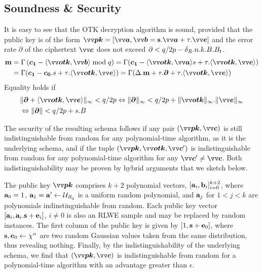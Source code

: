 \subsection{Soundness \& Security} It is easy to see that the OTK decryption algorithm is sound, provided that the public key is of the form $\pv{pk}=[\pv{a},\pv{b}=\ps.\pv{a}+\tau.\pv{e}]$ and the error rate $\partial$ of the ciphertext $\pv{c}$ does not exceed $\partial < q/2p - \delta_{\mathit{R}}.n.k.B.B_t$.
\begin{align*}
    \ppm&=\Gamma\left(\p{c_1} - \inprod{\pv{otk}}{\pv{b}} \bmod q\right)
    =\Gamma(\p{c_1} - \inprod{\pv{otk}}{\pv{a}}s+\tau.\inprod{\pv{otk}}{\pv{e}})\\
    &=\Gamma(\p{c_1} - \p{c_0}.s+\tau.\inprod{\pv{otk}}{\pv{e}})
    =\Gamma(\Delta.\ppm+\tau.\p{\partial} + \tau.\inprod{\pv{otk}}{\pv{e}})
\end{align*}
Equality holds if 
\begin{align*}
    &\|\p{\partial} + \inprod{\pv{otk}}{\pv{e}}\|_{\infty} < q/2p \Leftrightarrow
    \|\p{\partial}\|_{\infty} < q/2p + \|\pv{otk}\|_{\infty}.\|\pv{e}\|_{\infty} \\
    &\Leftrightarrow \|\p{\partial}\| < q/2p + s.B
\end{align*}

The security of the resulting schema follows if any pair $(\pv{pk},\pv{c})$ is still indistinguishable from random for any polynomial-time algorithm, as it is the underlying schema, and if the tuple $(\pv{pk},\pv{otk},\pv{c}')$ is indistinguishable from random for any polynomial-time algorithm for any $\pv{c}' \neq \pv{c}$. Both indistinguishability may be proven by hybrid arguments that we sketch below.

The public key $\pv{pk}$ comprises $k+2$ polynomial vectors, $[\mathbf{a}_i,\mathbf{b}_i]_{i=0}^{k+2}$, where $\mathbf{a}_0=1$, $\mathbf{a}_1=\mathbf{a}' \leftarrow \mathcal{U}_{\mathit{R}_q}$ is a uniform random polynomial, and $\mathbf{a}_j$ for $1<j<k$ are polynomials indinstinguishable from random. Each public key vector $[\mathbf{a}_i, \mathbf{a}_i.\mathbf{s}+\mathbf{e}_i]$, $i\neq 0$ is also an \ac{RLWE} sample and may be replaced by random instances. The first column of the public key is given by $[1, \mathbf{s} + \mathbf{e}_0]$, where $\mathbf{s}, \mathbf{e}_0 \leftarrow \chi^n$ are two random Gaussian values taken from the same distribution, thus revealing nothing. Finally, by the indistinguishability of the underlying schema, we find that $(\pv{pk},\pv{c})$ is indistinguishable from random for a polynomial-time algorithm with an advantage greater than $\epsilon$.

